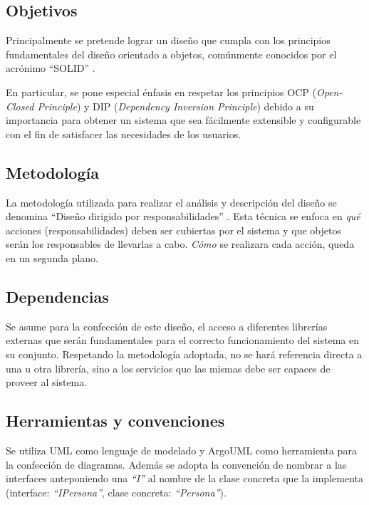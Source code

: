\documentclass[a4paper,10pt]{article}
\begin{document}
\subsection{Objetivos}

Principalmente se pretende lograr un dise\~no que cumpla con los principios
fundamentales del dise\~no orientado a objetos, com\'unmente conocidos por el
acr\'onimo ``SOLID'' \cite{martin00}.

En particular, se pone especial \'enfasis en respetar los principios OCP
(\textit{Open-Closed Principle}) y DIP (\textit{Dependency Inversion Principle})
debido a su importancia para obtener un sistema que sea f\'acilmente extensible
y configurable con el fin de satisfacer las necesidades de los usuarios.
  
\subsection{Metodolog\'ia}

La metodolog\'ia utilizada para realizar el an\'alisis y descripci\'on del
dise\~no se denomina ``Dise\~no dirigido por responsabilidades''
\cite{wirfsbrok03}. Esta t\'ecnica se enfoca en \textit{qu\'e} acciones
(responsabilidades) deben ser cubiertas por el sistema y que objetos ser\'an los
responsables de llevarlas a cabo. \textit{C\'omo} se realizara cada acci\'on,
queda en un segunda plano.

\subsection{Dependencias}

Se asume para la confecci\'on de este dise\~no, el acceso a diferentes
librer\'ias externas que ser\'an fundamentales para el correcto funcionamiento
del sistema en su conjunto. Respetando la metodolog\'ia adoptada, no se har\'a
referencia directa a una u otra librer\'ia, sino a los servicios que las mismas
debe ser capaces de proveer al sistema.

\subsection{Herramientas y convenciones}

Se utiliza UML\cite{uml} como lenguaje de modelado y ArgoUML\cite{argoUML}
como herramienta para la confecci\'on de diagramas. Adem\'as se adopta la
convenci\'on de nombrar a las interfaces anteponiendo una \textit{``I''} al
nombre de la clase concreta que la implementa (interface: \textit{``IPersona''},
clase concreta: \textit{``Persona''}).
\end{document}
